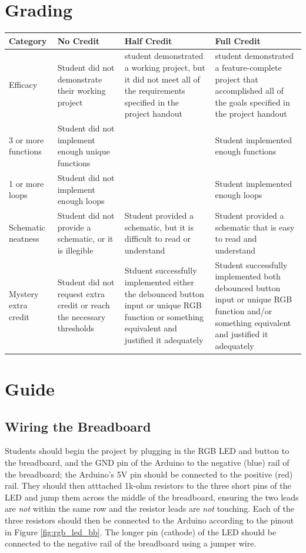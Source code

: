 \documentclass{article}
\begin{document}
\section*{Grading}
\begin{tabular}{ | p{1in} | p{1.75in} | p{1.75in} | p{1.75in} | }
    \hline
    \textbf{Category} & \textbf{No Credit} & \textbf{Half Credit} & \textbf{Full Credit} \\

    \hline
    Efficacy & 
    Student did not demonstrate their working project & 
    student demonstrated a working project, but it did not meet all of the requirements specified in the project handout & 
    student demonstrated a feature-complete project that accomplished all of the goals specified in the project handout \\
    \hline
    3 or more functions & 
    Student did not implement enough unique functions &
    &
    Student implemented enough functions \\
    \hline
    1 or more loops & 
    Student did not implement enough loops &
    &
    Student implemented enough loops \\
    \hline
    Schematic neatness & 
    Student did not provide a schematic, or it is illegible &
    Student provided a schematic, but it is difficult to read or understand &
    Student provided a schematic that is easy to read and understand \\
    \hline
    Mystery extra credit &
    Student did not request extra credit or reach the necessary thresholds & 
    Stduent successfully implemented either the debounced button input or unique RGB function or something equivalent and justified it adequately &
    Student successfully implemented both debounced button input or unique RGB function and/or something equivalent and justified it adequately \\

    \hline
\end{tabular}

\section*{Guide}

    \subsection*{Wiring the Breadboard}

    Students should begin the project by plugging in the RGB LED and button to the breadboard, and the GND pin of the Arduino to the negative (blue) rail of the breadboard; the Arduino's 5V pin should be connected to the positive (red) rail.
    They should then atttached 1k-ohm resistors to the three short pins of the LED and jump them across the middle of the breadboard, ensuring the two leads are \emph{not} within the same row and the resistor leads are \emph{not} touching.
    Each of the three resistors should then be connected to the Arduino according to the pinout in Figure \ref{fig:rgb_led_bb}.
    The longer pin (cathode) of the LED should be connected to the negative rail of the breadboard using a jumper wire.
\end{document}
